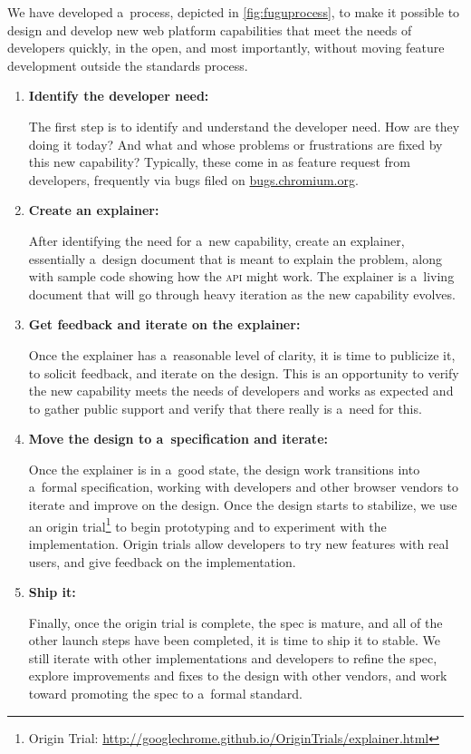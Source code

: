 \documentclass[sigconf]{acmart}
\begin{document}
We have developed a~process, depicted in \autoref{fig:fuguprocess},
to make it possible to design and develop new web platform capabilities
that meet the needs of developers quickly, in the open, and most importantly,
without moving feature development outside the standards process.

\begin{enumerate}
  \item \textbf{Identify the developer need:}
  
  The first step is to identify and understand the developer need.
  How are they doing it today? And what and whose problems or frustrations
  are fixed by this new capability? Typically, these come in as feature request
  from developers, frequently via bugs filed on \url{bugs.chromium.org}.

  \item \textbf{Create an explainer:}

  After identifying the need for a~new capability, create an explainer,
  essentially a~design document that is meant to explain the problem,
  along with sample code showing how the \textsc{api} might work.
  The explainer is a~living document that will go through heavy iteration
  as the new capability evolves.

  \item \textbf{Get feedback and iterate on the explainer:}

  Once the explainer has a~reasonable level of clarity,
  it is time to publicize it, to solicit feedback, and iterate on the design.
  This is an opportunity to verify the new capability meets the needs of developers
  and works as expected and to gather public support and verify
  that there really is a~need for this.

  \item \textbf{Move the design to a~specification and iterate:}
  
  Once the explainer is in a~good state,
  the design work transitions into a~formal specification,
  working with developers and other browser vendors to iterate and improve on the design.
  Once the design starts to stabilize, we use an
  origin trial\footnote{Origin Trial: \url{http://googlechrome.github.io/OriginTrials/explainer.html}}
  to begin prototyping and to experiment with the implementation.
  Origin trials allow developers to try new features with real users,
  and give feedback on the implementation.

  \item \textbf{Ship it:}

  Finally, once the origin trial is complete, the spec is mature,
  and all of the other launch steps have been completed, it is time to ship it to stable.
  We still iterate with other implementations and developers
  to refine the spec, explore improvements and fixes to the design with other vendors,
  and work toward promoting the spec to a~formal standard.
\end{enumerate}
\end{document}
